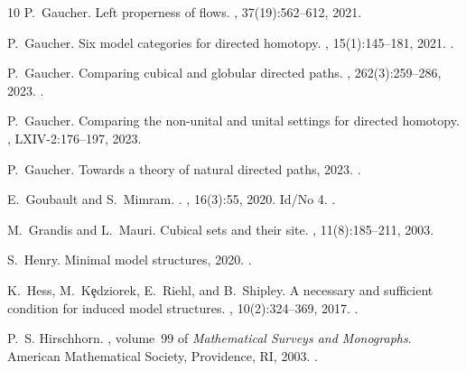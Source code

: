 \documentclass[a4paper,12pt]{amsart}
\theoremstyle{definition}
\begin{document}
\begin{thebibliography}{10}
	P.~Gaucher.
	\newblock Left properness of flows.
	, 37(19):562--612, 2021.
	
	P.~Gaucher.
	\newblock Six model categories for directed homotopy.
	, 15(1):145--181, 2021.
	\newblock \href {https://doi.org/10.52547/cgasa.15.1.145}
	{}.
	
	P.~Gaucher.
	\newblock Comparing cubical and globular directed paths.
	, 262(3):259--286, 2023.
	\newblock \href {https://doi.org/10.4064/fm219-3-2023}
	{}.
	
	P.~Gaucher.
	\newblock Comparing the non-unital and unital settings for directed homotopy.
	, LXIV-2:176--197, 2023.
	
	P.~Gaucher.
	\newblock Towards a theory of natural directed paths, 2023.
	\newblock \href {https://doi.org/10.48550/arXiv.2306.02792}
	{}.
	
	E.~{Goubault} and S.~{Mimram}.
	.
	, 16(3):55, 2020.
	\newblock Id/No 4.
	\newblock \href {https://doi.org/10.23638/LMCS-16(3:4)2020}
	{}.
	
	M.~Grandis and L.~Mauri.
	\newblock Cubical sets and their site.
	, 11(8):185--211, 2003.
	
	S.~Henry.
	\newblock Minimal model structures, 2020.
	\newblock \href {https://doi.org/10.48550/arXiv.2011.13408}
	{}.
	
	K.~Hess, M.~K\c{e}dziorek, E.~Riehl, and B.~Shipley.
	\newblock A necessary and sufficient condition for induced model structures.
	, 10(2):324--369, 2017.
	\newblock \href {https://doi.org/10.1112/topo.12011}
	{}.
	
	P.~S. Hirschhorn.
	, volume~99 of {\em
		Mathematical Surveys and Monographs}.
	\newblock American Mathematical Society, Providence, RI, 2003.
	\newblock \href {https://doi.org/10.1090/surv/099}
	{}.
	

\end{thebibliography}
\end{document}
